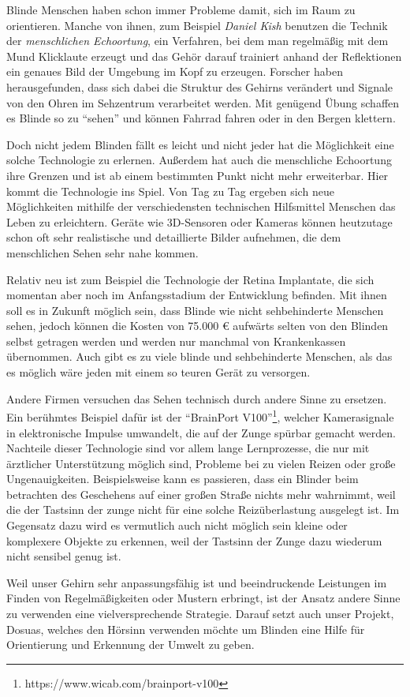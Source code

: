 \documentclass[a4paper,12pt,ngerman]{scrartcl}
\begin{document}
Blinde Menschen haben schon immer Probleme damit, sich im Raum zu orientieren.
Manche von ihnen, zum Beispiel \textit{Daniel Kish} benutzen die Technik der 
\textit{menschlichen Echoortung}, ein Verfahren, bei dem
man regelmäßig mit dem Mund Klicklaute erzeugt und das Gehör darauf trainiert 
anhand der Reflektionen ein genaues Bild der Umgebung im Kopf zu erzeugen.
Forscher haben herausgefunden, dass sich dabei die Struktur des Gehirns verändert 
und Signale von den Ohren im Sehzentrum verarbeitet werden.
Mit genügend Übung schaffen es Blinde so zu \enquote{sehen} und können Fahrrad 
fahren oder in den Bergen klettern. \par 
Doch nicht jedem Blinden fällt es leicht und nicht jeder hat die Möglichkeit eine
solche Technologie zu erlernen. Außerdem hat auch die menschliche Echoortung ihre
Grenzen und ist ab einem bestimmten Punkt nicht mehr erweiterbar. Hier kommt die 
Technologie ins Spiel. Von Tag zu Tag ergeben sich neue Möglichkeiten mithilfe 
der verschiedensten technischen Hilfsmittel Menschen das Leben zu erleichtern.
Geräte wie 3D-Sensoren oder Kameras können heutzutage schon oft sehr realistische
und detaillierte Bilder aufnehmen, die dem menschlichen Sehen sehr nahe kommen. \par 
Relativ neu ist zum Beispiel die Technologie der Retina Implantate, die sich 
momentan aber noch im Anfangsstadium der Entwicklung befinden. Mit ihnen soll es in 
Zukunft möglich sein, dass Blinde wie nicht sehbehinderte Menschen sehen, jedoch
können die Kosten von 75.000 \euro{} aufwärts selten von den Blinden selbst getragen
werden und werden nur manchmal von Krankenkassen übernommen. Auch gibt es zu viele
blinde und sehbehinderte Menschen, als das es möglich wäre jeden mit einem so 
teuren Gerät zu versorgen.\par 
Andere Firmen versuchen das Sehen technisch durch andere Sinne zu ersetzen.
Ein berühmtes Beispiel dafür ist der 
\enquote{BrainPort V100}\footnote{https://www.wicab.com/brainport-v100}, welcher 
Kamerasignale in elektronische Impulse umwandelt, die auf der Zunge spürbar
gemacht werden. Nachteile dieser
Technologie sind vor allem lange Lernprozesse, die nur mit ärztlicher Unterstützung
möglich sind, Probleme bei zu vielen Reizen oder große Ungenauigkeiten.
Beispielsweise kann es passieren, dass ein Blinder beim betrachten des Geschehens auf 
einer großen Straße nichts mehr wahrnimmt, weil die der Tastsinn der zunge
nicht für eine 
solche Reizüberlastung ausgelegt ist. Im Gegensatz dazu wird es vermutlich auch nicht
möglich sein kleine oder komplexere Objekte zu erkennen, weil der Tastsinn der Zunge
dazu wiederum nicht sensibel genug ist. \par
Weil unser Gehirn sehr anpassungsfähig ist und beeindruckende
Leistungen im Finden von Regelmäßigkeiten oder Mustern erbringt, ist der Ansatz
andere Sinne zu verwenden eine vielversprechende Strategie. Darauf setzt auch 
unser Projekt, Dosuas, welches den Hörsinn verwenden möchte um Blinden eine Hilfe
für Orientierung und Erkennung der Umwelt zu geben.
\end{document}
